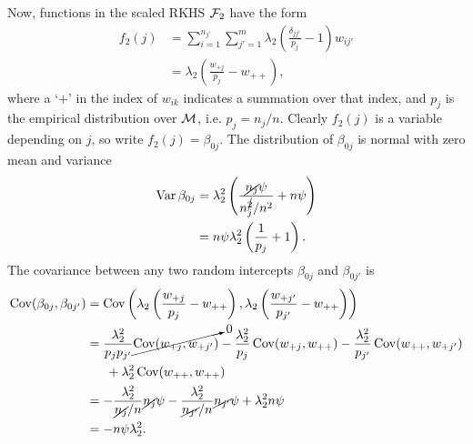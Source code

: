 Now, functions in the scaled RKHS ${\mathcal F}_2$ have the form
\begin{align*}
  f_2(j) 
  &= \sum_{i=1}^{n_{j'}}\sum_{j'=1}^m \lambda_2\left( \frac{\delta_{jj'}}{p_j} - 1 \right)w_{ij'} \\
  &=  \lambda_2\left( \frac{w_{+j}}{p_j} - w_{++} \right),
\end{align*}
where a `$+$' in the index of $w_{ik}$ indicates a summation over that index, and $p_j$ is the empirical distribution over ${\mathcal M}$, i.e. $p_j = n_j/n$.
Clearly $f_2(j)$ is a variable depending on $j$, so write $f_2(j)=\beta_{0j}$.
The distribution of $\beta_{0j}$ is normal with zero mean and variance
\begin{align*}
  \operatorname{Var} \beta_{0j} 
  &= \lambda_2^2 \left( \frac{\cancel{n_j}\psi}{n_j^{\cancel{2}} / n^2} + n\psi \right)  \\
  &= n\psi\lambda_2^2 \left( \frac{1}{p_j} + 1 \right).
\end{align*}
The covariance between any two random intercepts $\beta_{0j}$ and $\beta_{0j'}$ is
\begin{align*}
  \operatorname{Cov}(\beta_{0j},\beta_{0j'})
  &= \operatorname{Cov}\left( \lambda_2\left( \frac{w_{+j}}{p_j} - w_{++} \right), \lambda_2\left( \frac{w_{+j'}}{p_{j'}} - w_{++} \right) \right)  \\
  &= \frac{\lambda_2^2}{p_j p_{j'}} \cancelto{0}{\operatorname{Cov}(w_{+j},w_{+j'})} - \frac{\lambda_2^2}{p_j} \operatorname{Cov}(w_{+j},w_{++}) - \frac{\lambda_2^2}{p_{j'}} \operatorname{Cov}(w_{++},w_{+j'}) \\
  &\phantom{==} + \lambda_2^2 \operatorname{Cov}(w_{++},w_{++}) \\
  &= - \frac{\lambda_2^2}{\cancel{n_j}/n} \cancel{n_j}\psi - \frac{\lambda_2^2}{\cancel{n_{j'}}/n} \cancel{n_{j'}}\psi + \lambda_2^2 n\psi \\
  &= -n\psi\lambda_2^2.
\end{align*}

